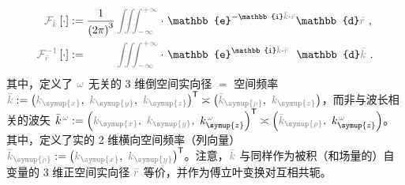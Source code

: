 \begin{subequations} \label{eq:FT-rk}
	\abovedisplayskip=10pt
	\belowdisplayskip=12pt
\begin{align}
	\mathcolor{gray}{\mathcal F_{\bar{k}}} \left[ \cdot \right] &:= \frac{ 1 }{ \left( 2\pi \right)^3 } \mathcolor{gray}{\iiint_{-\infty}^{+\infty}} \cdot~ \mathbb{e}^{-\mathbb{i}\mathcolor{gray}{\bar{k}} \cdot \mathcolor{gray}{\bar{r}}} \mathbb{d}\mathcolor{gray}{\bar{r}} ~, \label{eq:FT-k} \\
	\mathcolor{gray}{\mathcal F_{\bar{r}}^{-1}} \left[ \cdot \right] &:= \hphantom{\frac{ 1 }{ \left( 2\pi \right)^3 }} \mathcolor{gray}{\iiint_{-\infty}^{+\infty}} \cdot~ \mathbb{e}^{\mathbb{i}\mathcolor{gray}{\bar{k}} \cdot \mathcolor{gray}{\bar{r}}} \hphantom{^-} \mathbb{d}\mathcolor{gray}{\bar{k}} ~. \label{eq:IFT-r}
\end{align}
\end{subequations}
其中，定义了 $\mathcolor{gray}{\omega}$ 无关的 3 维倒空间实向径 $=$ 空间频率 $\mathcolor{gray}{\bar{k}} := \left( \mathcolor{gray}{k_{\symup{x}}},~ \mathcolor{gray}{k_{\symup{y}}},~ \mathcolor{gray}{k_{\symup{z}}} \right)^\mathsf{T} \asymp \left( \mathcolor{gray}{\bar{k}_{\symup{\rho}}},~ \mathcolor{gray}{k_{\symup{z}}} \right)$，而非与波长相关的波矢 $\bar{k}^{\;\! \mathcolor{gray}{\omega}} := \left( \mathcolor{gray}{k_{\symup{x}}},~ \mathcolor{gray}{k_{\symup{y}}},~ k_{\symup{z}}^{\;\! \mathcolor{gray}{\omega}} \right)^\mathsf{T} \asymp \left( \mathcolor{gray}{\bar{k}_{\symup{\rho}}},~ k_{\symup{z}}^{\;\! \mathcolor{gray}{\omega}} \right)$。其中，定义了实的 2 维横向空间频率（列向量） $\mathcolor{gray}{\bar{k}_{\symup{\rho}}} := \left( \mathcolor{gray}{k_{\symup{x}}},~ \mathcolor{gray}{k_{\symup{y}}} \right)^\mathsf{T}$。注意，$\mathcolor{gray}{\bar{k}}$ 与同样作为被积（和场量的）自变量的 3 维正空间实向径 $\mathcolor{gray}{\bar{r}}$ 等价，并作为傅立叶变换对互相共轭。

